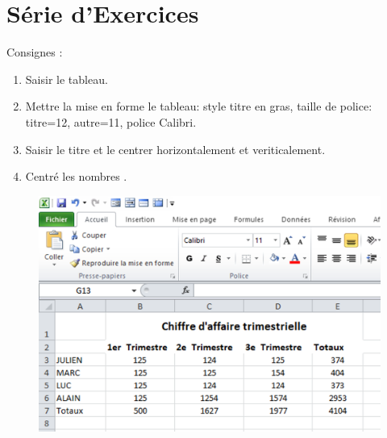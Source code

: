 \section{Série d'Exercices}
\begin{exercice}\label{ex03}
	Consignes :
\begin{enumerate}
	
	\item  Saisir le tableau.  				
	\item  Mettre la mise en forme le tableau: style titre en gras, taille de police: titre=12, autre=11, police Calibri.				
	\item  Saisir le titre et le centrer horizontalement et veriticalement.				
	\item  Centré les nombres .
\end{enumerate}
\end{exercice} 
\begin{figure}[H]  
	\centering
	\includegraphics[scale=0.2,width=0.7 \linewidth]{img/ex03} 
\end{figure} 

